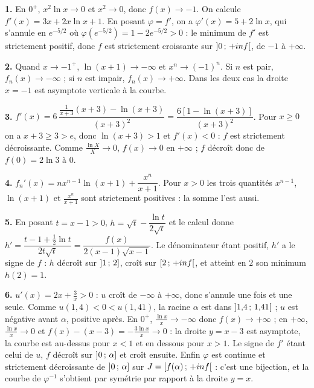 \begin{corrige}[annales]
\textbf{1.} En $0^{+}$, $x^{2}\ln x\to0$ et $x^{2}\to0$, donc $f(x)\to-1$. On
calcule $f'(x) = 3x+2x\ln x+1$. En posant $\varphi = f'$, on a
$\varphi'(x) = 5+2\ln x$, qui s'annule en $e^{-5/2}$ où
$\varphi\!\left(e^{-5/2}\right) = 1-2e^{-5/2}>0$ : le minimum de $f'$ est
strictement positif, donc $f$ est strictement croissante sur
$\left]0\,;\,+inf\right[$, de $-1$ à $+\infty$.

\textbf{2.} Quand $x\to-1^{+}$, $\ln(x+1)\to-\infty$ et $x^{n}\to(-1)^{n}$. Si
$n$ est pair, $f_{n}(x)\to-\infty$ ; si $n$ est impair, $f_{n}(x)\to+\infty$.
Dans les deux cas la droite $x = -1$ est asymptote verticale à la courbe.

\textbf{3.} $f'(x) = 6\,\dfrac{\frac{1}{x+3}(x+3)-\ln(x+3)}{(x+3)^{2}}
= \dfrac{6\left[1-\ln(x+3)\right]}{(x+3)^{2}}$. Pour $x \geq 0$ on a
$x+3 \geq 3 > e$, donc $\ln(x+3)>1$ et $f'(x)<0$ : $f$ est strictement
décroissante. Comme $\frac{\ln X}{X}\to0$, $f(x)\to0$ en $+\infty$ ; $f$
décroît donc de $f(0) = 2\ln3$ à $0$.

\textbf{4.} $f_{n}'(x) = nx^{n-1}\ln(x+1)+\dfrac{x^{n}}{x+1}$. Pour $x>0$ les
trois quantités $x^{n-1}$, $\ln(x+1)$ et $\frac{x^{n}}{x+1}$ sont strictement
positives : la somme l'est aussi.

\textbf{5.} En posant $t = x-1>0$, $h = \sqrt t-\dfrac{\ln t}{2\sqrt t}$ et le
calcul donne $h' = \dfrac{t-1+\frac12\ln t}{2t\sqrt t}
= \dfrac{f(x)}{2(x-1)\sqrt{x-1}}$. Le dénominateur étant positif, $h'$ a le
signe de $f$ : $h$ décroît sur $\left]1\,;\,2\right]$, croît sur
$\left[2\,;\,+inf\right[$, et atteint en $2$ son minimum $h(2) = 1$.

\textbf{6.} $u'(x) = 2x+\frac3x>0$ : $u$ croît de $-\infty$ à $+\infty$, donc
s'annule une fois et une seule. Comme $u(1{,}4)<0<u(1{,}41)$, la racine
$\alpha$ est dans $\left]1{,}4\,;\,1{,}41\right[$ ; $u$ est négative avant
$\alpha$, positive après. En $0^{+}$, $\frac{\ln x}{x}\to-\infty$ donc
$f(x)\to+\infty$ ; en $+\infty$, $\frac{\ln x}{x}\to0$ et
$f(x)-(x-3) = -\frac{3\ln x}{x}\to0$ : la droite $y = x-3$ est asymptote, la
courbe est au-dessus pour $x<1$ et en dessous pour $x>1$. Le signe de $f'$
étant celui de $u$, $f$ décroît sur $\left]0\,;\,\alpha\right]$ et croît
ensuite. Enfin $\varphi$ est continue et strictement décroissante de
$\left]0\,;\,\alpha\right]$ sur $J = \left[f(\alpha)\,;\,+inf\right[$ :
c'est une bijection, et la courbe de $\varphi^{-1}$ s'obtient par symétrie
par rapport à la droite $y = x$.


\end{corrige}
